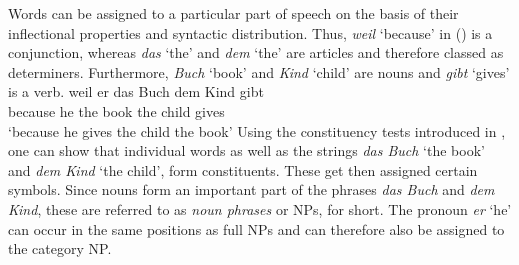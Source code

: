 Words can be assigned to a particular part of speech on the basis of their inflectional properties
and syntactic distribution. Thus, \emph{weil} `because' in ()
is a conjunction, whereas \emph{das} `the' and \emph{dem} `the' are
articles and therefore classed as determiners. Furthermore, \emph{Buch} `book' and \emph{Kind} `child' are nouns 
and \emph{gibt} `gives' is a verb.
\ea\label{bsp-weil-er-das-buch-dem-mann-gibt}
\gll weil er das Buch dem Kind gibt\\
	 because he the book the child gives\\
\glt `because he gives the child the book'
\z
Using the constituency tests introduced in , one can show that
individual words as well as the strings \emph{das Buch} `the book' and \emph{dem Kind} `the child',
form constituents. These get then assigned certain symbols. Since nouns form an important part of
the phrases \emph{das Buch} and \emph{dem Kind}, these are referred to as \emph{noun phrases} or
NPs, for short. The pronoun \emph{er} `he' can occur in the same positions as full NPs and can
therefore also be assigned to the category NP.

